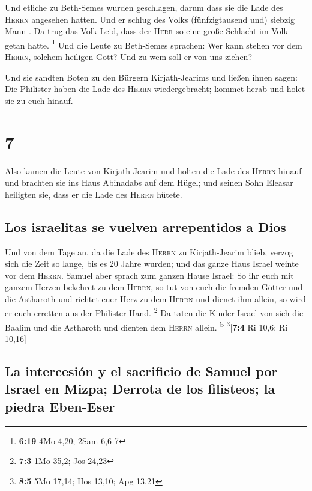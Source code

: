  Und etliche zu Beth-Semes wurden geschlagen, darum dass
sie die Lade des \textsc{Herrn} angesehen hatten. Und er schlug des
Volks (fünfzigtausend und) siebzig Mann . Da trug das Volk Leid, dass
der \textsc{Herr} so eine große Schlacht im Volk getan hatte.
\footnote{\textbf{6:19} 4Mo 4,20; 2Sam 6,6-7}  Und die
Leute zu Beth-Semes sprachen: Wer kann stehen vor dem \textsc{Herrn},
solchem heiligen Gott? Und zu wem soll er von uns ziehen?

 Und sie sandten Boten zu den Bürgern Kirjath-Jearims und
ließen ihnen sagen: Die Philister haben die Lade des \textsc{Herrn}
wiedergebracht; kommet herab und holet sie zu euch hinauf.

\hypertarget{section-6}{%
\section{7}\label{section-6}}

 Also kamen die Leute von Kirjath-Jearim und holten die
Lade des \textsc{Herrn} hinauf und brachten sie ins Haus Abinadabs auf
dem Hügel; und seinen Sohn Eleasar heiligten sie, dass er die Lade des
\textsc{Herrn} hütete.

\hypertarget{los-israelitas-se-vuelven-arrepentidos-a-dios}{%
\subsection{Los israelitas se vuelven arrepentidos a
Dios}\label{los-israelitas-se-vuelven-arrepentidos-a-dios}}

 Und von dem Tage an, da die Lade des \textsc{Herrn} zu
Kirjath-Jearim blieb, verzog sich die Zeit so lange, bis es 20 Jahre
wurden; und das ganze Haus Israel weinte vor dem \textsc{Herrn}.
 Samuel aber sprach zum ganzen Hause Israel: So ihr euch
mit ganzem Herzen bekehret zu dem \textsc{Herrn}, so tut von euch die
fremden Götter und die Astharoth und richtet euer Herz zu dem
\textsc{Herrn} und dienet ihm allein, so wird er euch erretten aus der
Philister Hand. \footnote{\textbf{7:3} 1Mo 35,2; Jos 24,23}
 Da taten die Kinder Israel von sich die Baalim und die
Astharoth und dienten dem \textsc{Herrn} allein. \textsuperscript{b}
\footnote{\textbf{8:5} 5Mo 17,14; Hos 13,10; Apg 13,21}{[}\textbf{7:4}
Ri 10,6; Ri 10,16{]}

\hypertarget{la-intercesiuxf3n-y-el-sacrificio-de-samuel-por-israel-en-mizpa-derrota-de-los-filisteos-la-piedra-eben-eser}{%
\subsection{La intercesión y el sacrificio de Samuel por Israel en
Mizpa; Derrota de los filisteos; la piedra
Eben-Eser}\label{la-intercesiuxf3n-y-el-sacrificio-de-samuel-por-israel-en-mizpa-derrota-de-los-filisteos-la-piedra-eben-eser}}

